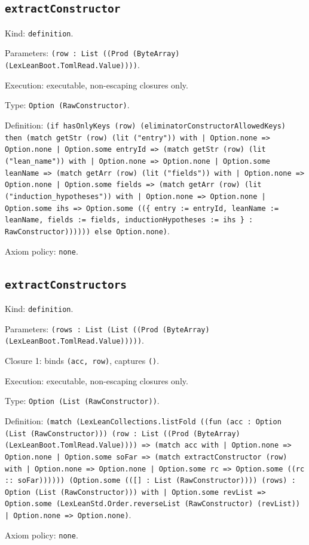 \documentclass[11pt]{article}
\begin{document}
\subsection*{\texttt{extractConstructor}}
\noindent Kind: \texttt{definition}.\par
\noindent Parameters: \texttt{(row : List ((Prod (ByteArray) (LexLeanBoot.TomlRead.Value))))}.\par
\noindent Execution: executable, non-escaping closures only.\par
\noindent Type: \texttt{Option (RawConstructor)}.\par
\noindent Definition: \texttt{(if hasOnlyKeys (row) (eliminatorConstructorAllowedKeys) then (match getStr (row) (lit ("entry")) with | Option.none => Option.none | Option.some entryId => (match getStr (row) (lit ("lean\_name")) with | Option.none => Option.none | Option.some leanName => (match getArr (row) (lit ("fields")) with | Option.none => Option.none | Option.some fields => (match getArr (row) (lit ("induction\_hypotheses")) with | Option.none => Option.none | Option.some ihs => Option.some ((\{ entry := entryId, leanName := leanName, fields := fields, inductionHypotheses := ihs \} : RawConstructor)))))) else Option.none)}.\par
\noindent Axiom policy: \texttt{none}.\par
\subsection*{\texttt{extractConstructors}}
\noindent Kind: \texttt{definition}.\par
\noindent Parameters: \texttt{(rows : List (List ((Prod (ByteArray) (LexLeanBoot.TomlRead.Value)))))}.\par
\noindent Closure 1: binds \texttt{(acc, row)}, captures \texttt{()}.\par
\noindent Execution: executable, non-escaping closures only.\par
\noindent Type: \texttt{Option (List (RawConstructor))}.\par
\noindent Definition: \texttt{(match (LexLeanCollections.listFold ((fun (acc : Option (List (RawConstructor))) (row : List ((Prod (ByteArray) (LexLeanBoot.TomlRead.Value)))) => (match acc with | Option.none => Option.none | Option.some soFar => (match extractConstructor (row) with | Option.none => Option.none | Option.some rc => Option.some ((rc :: soFar)))))) (Option.some (([] : List (RawConstructor)))) (rows) : Option (List (RawConstructor))) with | Option.some revList => Option.some (LexLeanStd.Order.reverseList (RawConstructor) (revList)) | Option.none => Option.none)}.\par
\noindent Axiom policy: \texttt{none}.\par
\end{document}
